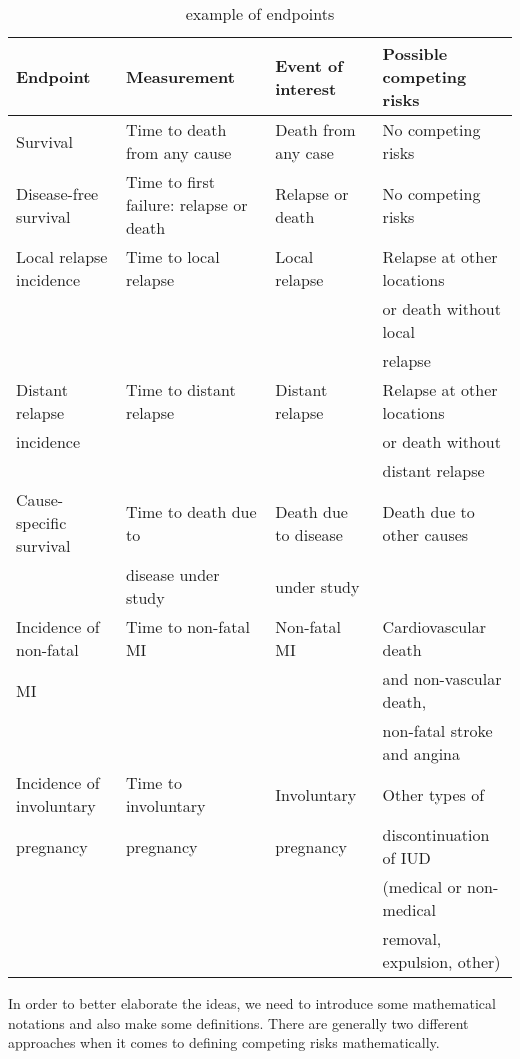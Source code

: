 \documentclass[times, doublespace]{simauth}
\begin{document}
\begin{table}[!htb]
	\begin{center}
		\caption{example of endpoints}\label{tab:endpoints}
		\begin{tabular}{llll}
		\hline
		Endpoint & Measurement & Event of interest & Possible competing risks\\
		\hline
		Survival & Time to death from any cause & Death from any case & No competing risks\\
		Disease-free survival & Time to first failure: relapse or death& Relapse or death& No competing risks\\
		Local relapse incidence & Time to local relapse & Local relapse & Relapse at other locations \\
		&&&or death without local \\
		&&&relapse\\
		Distant relapse& Time to distant relapse & Distant relapse & Relapse at other locations \\
		 incidence &&& or death without \\
		&&&distant relapse\\
		Cause-specific survival & Time to death due to & Death due to disease & Death due to other causes\\
		&disease under study &under study&\\
		Incidence of non-fatal& Time to non-fatal MI& Non-fatal MI& Cardiovascular death\\
		MI&&&and non-vascular death,\\
		&&&non-fatal stroke and angina\\
		Incidence of involuntary& Time to involuntary & Involuntary & Other types of\\
		pregnancy& pregnancy &pregnancy& discontinuation of IUD\\
		&&&(medical or non-medical\\
		&&&removal, expulsion, other)\\
		\hline
		\end{tabular}
	\end{center}
\end{table}

In order to better elaborate the ideas, we need to introduce some mathematical notations and also make some definitions. There are generally two different approaches when it comes to defining competing risks mathematically\cite{pintilie06}. 
\end{document}
